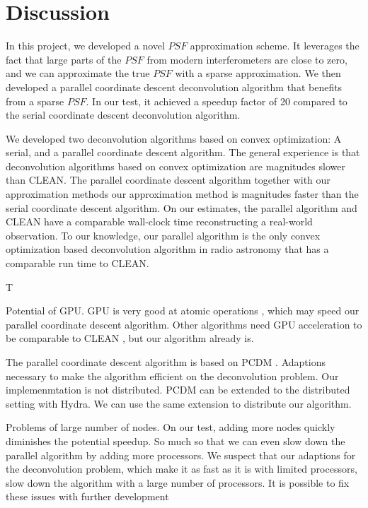 \section{Discussion}\label{discussion}
In this project, we developed a novel $PSF$ approximation scheme. It leverages the fact that large parts of the $PSF$ from modern interferometers are close to zero, and we can approximate the true $PSF$ with a sparse approximation. We then developed a parallel coordinate descent deconvolution algorithm that benefits from a sparse $PSF$. In our test, it achieved a speedup factor of 20 compared to the serial coordinate descent deconvolution algorithm.

We developed two deconvolution algorithms based on convex optimization: A serial, and a parallel coordinate descent algorithm. The general experience is that deconvolution algorithms based on convex optimization are magnitudes slower than CLEAN\cite{offringa2017optimized}. The parallel coordinate descent algorithm together with our approximation methods our approximation method is magnitudes faster than the serial coordinate descent algorithm. On our estimates, the parallel algorithm and CLEAN have a comparable wall-clock time reconstructing a real-world observation. To our knowledge, our parallel algorithm is the only convex optimization based deconvolution algorithm in radio astronomy that has a comparable run time to CLEAN.

T

Potential of GPU. GPU is very good at atomic operations \cite{keplerShuffle}, which may speed our parallel coordinate descent algorithm. Other algorithms need GPU acceleration to be comparable to CLEAN \cite{dabbech2015moresane}, but our algorithm already is.

The parallel coordinate descent algorithm is based on PCDM \cite{richtarik2016parallel}. Adaptions necessary to make the algorithm efficient on the deconvolution problem. Our implemenmtation is not distributed. PCDM can be extended to the distributed setting with Hydra. We can use the same extension to distribute our algorithm.

Problems of large number of nodes. On our test, adding more nodes quickly diminishes the potential speedup. So much so that we can even slow down the parallel algorithm by adding more processors. 
We suspect that our adaptions for the deconvolution problem, which make it as fast as it is with limited processors, slow down the algorithm with a large number of processors.
It is possible to fix these issues with further development


